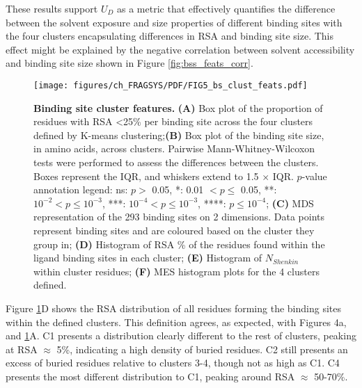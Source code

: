 These results support $U_{D}$ as a metric that effectively quantifies the difference between the solvent exposure and size properties of different binding sites with the four clusters encapsulating differences in RSA and binding site size. This effect might be explained by the negative correlation between solvent accessibility and binding site size shown in Figure \ref{fig:bss_feats_corr}.

\begin{figure}[h]
    \centering
    \texttt{[image: figures/ch\_FRAGSYS/PDF/FIG5\_bs\_clust\_feats.pdf]}
    \caption[Binding site cluster features]{\textbf{Binding site cluster features.} \textbf{(A)} Box plot of the proportion of residues with RSA \textless 25\% per binding site across the four clusters defined by K-means clustering;\textbf{(B)} Box plot of the binding site size, in amino acids, across clusters. Pairwise Mann-Whitney-Wilcoxon tests were performed to assess the differences between the clusters. Boxes represent the IQR, and whiskers extend to 1.5 $\times$ IQR. $p$-value annotation legend: ns: $p >$ 0.05, *: 0.01 $< p \leq$ 0.05, **: $10^{-2} < p \leq 10^{-3}$, ***: $10^{-4} < p \leq 10^{-3}$, ****: $p \leq 10^{-4}$; \textbf{(C)} MDS representation of the 293 binding sites on 2 dimensions. Data points represent binding sites and are coloured based on the cluster they group in; \textbf{(D)} Histogram of RSA \% of the residues found within the ligand binding sites in each cluster; \textbf{(E)} Histogram of $N_{Shenkin}$ within cluster residues; \textbf{(F)} MES histogram plots for the 4 clusters defined.}
    \label{fig:bs_clusts_feats}
\end{figure}

Figure \ref{fig:bs_clusts_feats}D shows the RSA distribution of all residues forming the binding sites within the defined clusters. This definition agrees, as expected, with Figures 4a, and  \ref{fig:bs_clusts_feats}A. C1 presents a distribution clearly different to the rest of clusters, peaking at RSA $\approx$ 5\%, indicating a high density of buried residues. C2 still presents an excess of buried residues relative to clusters 3-4, though not as high as C1. C4 presents the most different distribution to C1, peaking around RSA $\approx$ 50-70\%.

